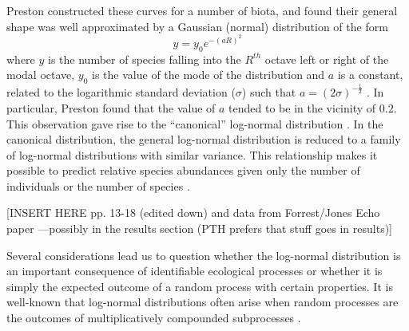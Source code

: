 Preston constructed these curves for a number of biota,
and found their general shape was well approximated by a Gaussian
(normal) distribution of the form $$ y = y_0 e^{-{(aR)}^2} $$ where
$y$ is the number of species falling into the $R^{th}$ octave left or
right of the modal octave, $y_0$ is the value of the mode of the
distribution and $a$ is a constant, related to the logarithmic
standard deviation ($\sigma$) such that $a = (2\sigma)^{-\frac{1}{2}}$
\cite{Preston48,MacArthurAndWilson67}.  In particular, Preston found
that the value of $a$ tended to be in the vicinity of $0.2$.  This
observation gave rise to the ``canonical'' log-normal distribution 
\cite{Preston62a,Preston62b}.  In the canonical distribution, the
general log-normal distribution is reduced to a family of log-normal
distributions with similar variance. This relationship makes it
possible to predict relative species abundances given only the
number of individuals or the number of species
\cite{Preston62a,Sugihara80}. 

[INSERT HERE pp. 13-18 (edited down) and data from Forrest/Jones Echo paper
---possibly in the results section (PTH prefers that stuff goes in results)]

Several considerations lead us to question whether the log-normal
distribution is an important consequence of identifiable ecological
processes or whether it is simply the expected outcome of a random
process with certain properties.  It is well-known that
log-normal distributions often arise when random processes are the
outcomes of multiplicatively compounded subprocesses
\cite{AitchisonBrown57,May75,May86,Hogg90a,MontrollSchlesinger82,Sugihara80}.


